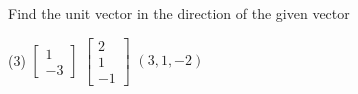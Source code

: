 \documentclass{ximera}
\begin{document}

\begin{exercise}
    Find the unit vector in the direction of the given vector
    \begin{tasks}(3)
        \task
        $\begin{bmatrix}
            1 \\
            -3 
        \end{bmatrix}$
        \task
        $\begin{bmatrix}
            2 \\
            1 \\
            -1
        \end{bmatrix}$
        \task $(3,1,-2)$
    \end{tasks}
\end{exercise}
\end{document}
